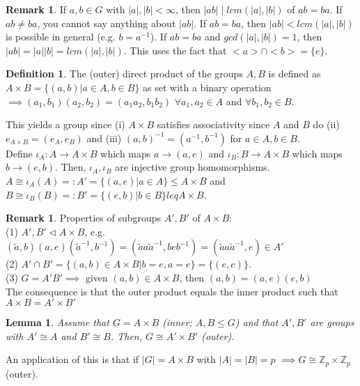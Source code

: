 \documentclass[11pt]{article}
\newtheorem{lem}[thm]{Lemma}
\theoremstyle{definition}
\newtheorem{definition}[thm]{Definition}
\newtheorem{rem}[thm]{Remark}
\numberwithin{equation}{section}
\newcommand{\Z}{\mathbb{Z}}
\begin{document}
\begin{rem}
If $a, b \in G$ with $|a|, |b| < \infty$, then $|ab| \mid lcm(|a|, |b|)$ of $ab = ba$. If $ab \neq ba$, you cannot say anything about $|ab|$. If $ab = ba$, then $|ab| < lcm(|a|, |b|)$ is possible in general (e.g. $b = a^{-1}$). If $ab = ba$ and $gcd(|a|, |b|) = 1$, then $|ab| = |a||b| = lcm(|a|, |b|)$. This uses the fact that $<a> \cap <b> = \{e\}$.
\end{rem}
\begin{definition}
The (outer) direct product of the groups $A, B$ is defined as $A \times B = \{(a,b) | a \in A, b \in B\}$ as set with a binary operation $\implies (a_1, b_1)(a_2, b_2) = (a_{1}a_{2}, b_{1}b_{2})$ $\forall a_{1}, a_{2} \in A$ and $\forall b_{1}, b_{2} \in B$.
\end{definition}
This yields a group since (i) $A \times B$ satisfies associativity since $A$ and $B$ do (ii) $e_{A \times B} = (e_A, e_B)$ and (iii) $(a, b)^{-1} = (a^{-1}, b^{-1})$ for $a \in A, b \in B$. \\
Define $\iota_A : A \rightarrow A \times B$ which maps $a \rightarrow (a, e)$ and $\iota_B : B \rightarrow A \times B$ which maps $b \rightarrow (e, b)$. Then, $\iota_A, \iota_B$ are injective group homomorphisms.\\
$A \cong \iota_{A}(A) =: A' = \{(a, e) | a \in A\} \leq A \times B$ and $B \cong \iota_{B}(B) =: B' = \{(e, b) | b \in B\} leq A \times B$.\\
\begin{rem}
Properties of subgroups $A', B'$ of $A \times B$:\\
(1) $A', B' \vartriangleleft A \times B$, e.g. $(\widetilde{a}, b)(a, e)(\widetilde{a}^{-1}, b^{-1}) = (\widetilde{a}a\widetilde{a}^{-1}, beb^{-1}) = (\widetilde{a}a\widetilde{a}^{-1}, e) \in A'$\\
(2) $A' \cap B' = \{(a, b) \in A \times B | b = e, a = e \} = \{(e, e)\}$.\\
(3) $G = A'B' \implies$ given $(a, b) \in A \times B$, then $(a, b) = (a, e)(e, b)$\\
The consequence is that the outer product equals the inner product such that $A \times B = A' \times B'$
\end{rem}
\begin{lem}
Assume that $G = A \times B$ (inner; $A, B \leq G$) and that $A', B'$ are groups with $A' \cong A$ and $B' \cong B$. Then, $G \cong A' \times B'$ (outer).
\end{lem}
An application of this is that if $|G| = A \times B$ with $|A| = |B| = p$ $\implies G \cong \Z_p \times \Z_p$ (outer).
\end{document}
